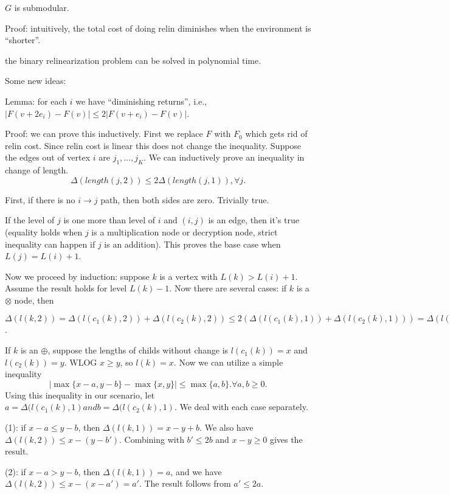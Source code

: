 \documentclass[11pt]{article} %
\theoremstyle{plain}
\theoremstyle{definition}
\begin{document}
\begin{lemma}
$G$ is submodular. 
\end{lemma}
Proof: intuitively, the total cost of doing relin diminishes when the environment is ``shorter''. 

\begin{corollary}
the binary relinearization problem can be solved in polynomial time. 
\end{corollary}

Some new ideas: 

Lemma: for each $i$ we have ``diminishing returns'', i.e.,  $|F(v + 2e_i) - F(v) |  \leq 2 |F(v+e_i) - F(v)|$. 

Proof: we can prove this inductively. First we replace $F$  with $F_0$ which gets rid of relin cost. Since relin cost is linear this does not change the inequality. Suppose the edges out of vertex $i$ are $j_1, \ldots ,j_K$. We can inductively prove an inequality in change of length. 
\[
	\Delta(length(j, 2)) \leq 2\Delta(length(j,1)), \forall j.  
\]


First, if there is no $i \to j$ path, then both sides are zero. Trivially true. 

If the level of $j$ is one more than level of $i$ and $(i,j)$ is an edge, then it's true (equality holds when 
$j$ is a multiplication node or decryption node, strict inequality can happen if $j$ is an addition). This proves the base case when $L(j) = L(i) + 1$. 

Now we proceed by induction: suppose $k$ is a vertex with $L(k) > L(i) + 1$. Assume the result 
holds for level $L(k) - 1$. Now there are several cases: if $k$ is a $\otimes$ node, then 


$\Delta(l(k, 2))  = \Delta(l(c_1(k), 2)) + \Delta(l(c_2(k), 2)) \leq 2(\Delta(l(c_1(k), 1)) + \Delta(l(c_2(k), 1))) = \Delta(l(k,1))$. 

If $k$ is an $\oplus$, suppose the lengths of childs without change is $l(c_1(k)) = x$ and $l(c_2(k)) = y$.
WLOG $x \geq y$, so $l(k) = x$. Now we can utilize a simple inequality 
\[
	| \max \{ x-a, y - b\} - \max \{x, y\} |  \leq \max \{a, b\}. \forall a,b \geq 0. 
\]
Using this inequality in our scenario, let $a = \Delta(l(c_1(k), 1) and b = \Delta(l(c_2(k), 1)$. We 
deal with each case separately. 

(1): if $x - a \leq y -b$, then $\Delta(l(k,1)) = x - y + b$. We also have $\Delta(l(k,2)) \leq x - (y - b')$. 
Combining with $b' \leq 2b$ and $x - y \geq 0$ gives the result.

(2): if $x-a > y-b$, then $\Delta(l(k,1)) = a$, and we have $\Delta(l(k,2)) \leq x - (x-a') = a'$. The result
follows from $a' \leq 2a$. 
\end{document}
